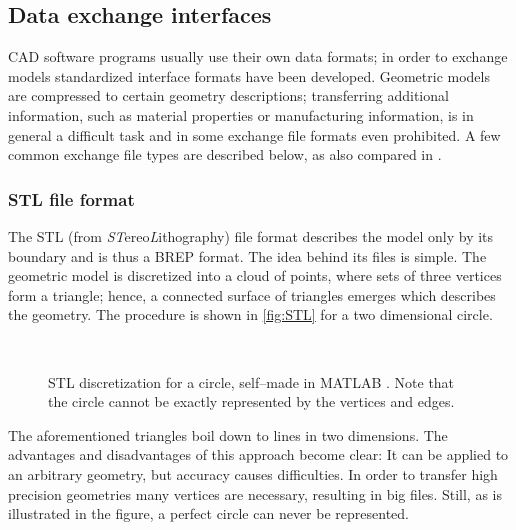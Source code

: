 \subsection{Data exchange interfaces}
CAD software programs usually use their own data formats; in order to exchange models standardized interface formats have been developed. Geometric models are compressed to certain geometry descriptions; transferring additional information, such as material properties or manufacturing information, is in general a difficult task and in some exchange file formats even prohibited. A few common exchange file types are described below, as also compared in \cite{STL}.
\subsubsection{STL file format} \label{subsub:STL}
The STL (from \emph{ST}ereo\emph{L}ithography) file format describes the model only by its boundary and is thus a BREP format. The idea behind its files is simple. The geometric model is discretized into a cloud of points, where sets of three vertices form a triangle; hence, a connected surface of triangles emerges which describes the geometry. The procedure is shown in \autoref{fig:STL} for a two dimensional circle.  
\begin{figure}
\centering
   \\
   \caption{STL discretization for a circle, self--made in MATLAB \cite{MATLAB}. Note that the circle cannot be exactly represented by the vertices and edges.}
   \label{fig:STL}
\end{figure}
The aforementioned triangles boil down to lines in two dimensions. The advantages and disadvantages of this approach become clear: It can be applied to an arbitrary geometry, but accuracy causes difficulties. In order to transfer high precision geometries many vertices are necessary, resulting in big files. Still, as is illustrated in the figure, a perfect circle can never be represented. 

